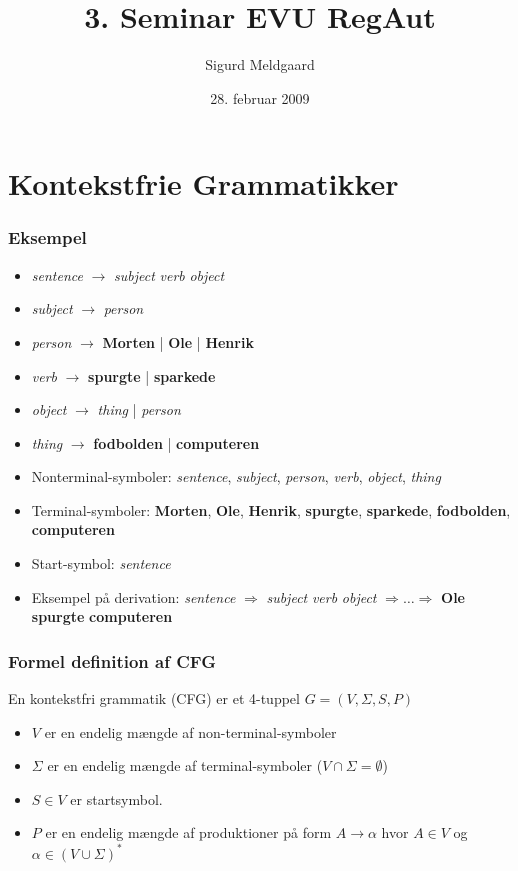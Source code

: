\documentclass[handout]{beamer}
\title{3. Seminar EVU RegAut}
\author{Sigurd Meldgaard}
\date{28. februar 2009}
\begin{document}
\maketitle

\section{Kontekstfrie Grammatikker}
\begin{frame}
\frametitle{Eksempel}
\begin{itemize}
\item \textit{sentence} $\rightarrow$  \textit{subject} \textit{verb} \textit{object}
\item \textit{subject} $\rightarrow$  \textit{person}
\item \textit{person} $\rightarrow$  \textbf{Morten}  |  \textbf{Ole}  |  \textbf{Henrik}
\item \textit{verb} $\rightarrow$  \textbf{spurgte}  |  \textbf{sparkede}
\item \textit{object} $\rightarrow$  \textit{thing}  |  \textit{person}
\item \textit{thing} $\rightarrow$  \textbf{fodbolden}  |  \textbf{computeren} 
\end{itemize}
\pause
\begin{itemize}[<+->]
\item Nonterminal-symboler:  
       \textit{sentence}, \textit{subject}, \textit{person}, \textit{verb}, \textit{object}, \textit{thing}
\item Terminal-symboler:  
       \textbf{Morten}, \textbf{Ole}, \textbf{Henrik}, \textbf{spurgte}, \textbf{sparkede},  
       \textbf{fodbolden}, \textbf{computeren}
\item Start-symbol:  \textit{sentence}
\item Eksempel på derivation: \textit{sentence} $\Rightarrow$  \textit{subject} \textit{verb} \textit{object}  $\Rightarrow \ldots \Rightarrow$  \textbf{Ole} \textbf{spurgte} \textbf{computeren}

\end{itemize}
\end{frame}

\begin{frame}
\frametitle{Formel definition af CFG}
En kontekstfri grammatik (CFG) er et 4-tuppel $G=(V,\Sigma, S, P)$
\pause
\begin{itemize}[<+->]
\item $V$ er en endelig mængde af non-terminal-symboler
\item $\Sigma$ er en endelig mængde af terminal-symboler ($V\cap\Sigma = \emptyset$)
\item $S\in V$ er startsymbol.
\item $P$ er en endelig mængde af produktioner på form $A\rightarrow  \alpha$  hvor $A\in V$ og $\alpha\in (V\cup\Sigma )^*$
\end{itemize}
\end{frame}
\end{document}
